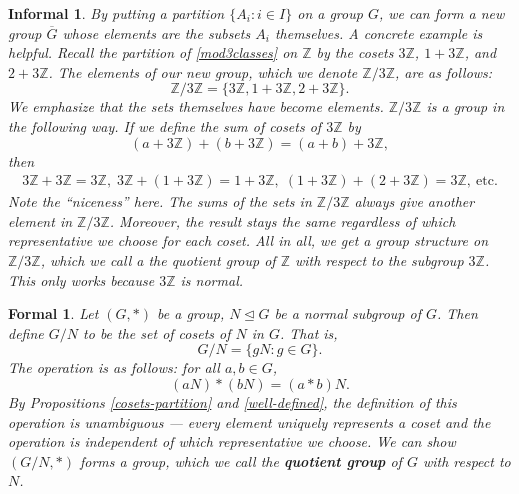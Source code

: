 \documentclass{amsart}
\newtheorem*{formal}{Formal}
\newtheorem*{informal}{Informal}
\begin{document}
\begin{definition}\label{quotient-group}
   \begin{informal}
      By putting a partition \(\{A_i: i\in I\}\) on a group \(G\), we can form
		a new group \(\overline{G}\) whose elements are the subsets \(A_i\)
		themselves. A concrete example is helpful. Recall the partition of
		\ref{mod3classes} on \(\mathbb{Z}\) by the cosets \(3\mathbb{Z}\), \(1 +
		3\mathbb{Z}\), and \(2 + 3\mathbb{Z}\). The elements of our new group,
		which we denote \(\mathbb{Z}/3\mathbb{Z}\), are as follows: 
		\[
		   \mathbb{Z}/3\mathbb{Z} = \{3\mathbb{Z}, 1 + 3\mathbb{Z},
			2+3\mathbb{Z}\}.
		\]
		We emphasize that the sets themselves have become elements.
		\(\mathbb{Z}/3\mathbb{Z}\) is a group in the following way. If we define
		the sum of cosets of \(3\mathbb{Z}\) by 
		\[
			(a + 3\mathbb{Z}) + (b + 3\mathbb{Z}) = (a + b) + 3\mathbb{Z},
		\]
		then 
		\begin{align*}
		   3\mathbb{Z} + 3\mathbb{Z} = 3\mathbb{Z}, \; 3\mathbb{Z} + (1 +
			3\mathbb{Z}) = 1 + 3\mathbb{Z}, \; (1 + 3\mathbb{Z}) + (2 +
			3\mathbb{Z}) = 3\mathbb{Z},~\text{etc.}
		\end{align*}
		Note the ``niceness'' here. The sums of the sets in
		\(\mathbb{Z}/3\mathbb{Z}\) always give another element in
		\(\mathbb{Z}/3\mathbb{Z}\). Moreover, the result stays the same
		regardless of which representative we choose for each coset. All in all,
		we get a group structure on \(\mathbb{Z}/3\mathbb{Z}\), which we call a
		the \emph{quotient group} of \(\mathbb{Z}\) with respect to
		the subgroup \(3\mathbb{Z}\). This only works because \(3\mathbb{Z}\) is
		normal.
   \end{informal}
	\begin{formal}
	   Let \((G, \ast)\) be a group, \(N\trianglelefteq G\) be a normal subgroup of
		\(G\). Then define \(G/N\) to be the set of cosets of \(N\) in \(G\).
		That is,
		\[
		   G/N = \{gN: g\in G\}.
		\]
		The operation is as follows: for all \(a, b\in G\), 
		\[
			(aN)\ast (bN) = (a\ast b)N.
		\]
		By Propositions \ref{cosets-partition} and \ref{well-defined}, the
		definition of this operation is unambiguous --- every element uniquely
		represents a coset and the operation is independent of which
		representative we choose. We can show \((G/N, \ast)\) forms a
		group, which we call the \textbf{quotient group} of \(G\) with respect to
		\(N\).
	\end{formal}
\end{definition}
\end{document}
